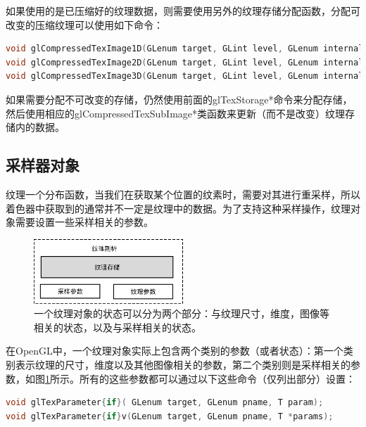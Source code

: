 如果使用的是已压缩好的纹理数据，则需要使用另外的纹理存储分配函数，分配可改变的压缩纹理可以使用如下命令：

\begin{lstlisting}[language=C++]
void glCompressedTexImage1D(GLenum target, GLint level, GLenum internalFormat, GLsizei width, GLint border, GLsizei imageSize, const void *data);
void glCompressedTexImage2D(GLenum target, GLint level, GLenum internalFormat, GLsizei width, GLsizei height, GLint border, GLsizei imageSize, const void *data);
void glCompressedTexImage3D(GLenum target, GLint level, GLenum internalFormat, GLsizei width, GLsizei height, GLsizei depth, GLint border, GLsizei imageSize, const void *data);
\end{lstlisting}

如果需要分配不可改变的存储，仍然使用前面的glTexStorage*命令来分配存储，然后使用相应的glCompressedTexSubImage*类函数来更新（而不是改变）纹理存储内的数据。






\subsection{采样器对象}
纹理一个分布函数，当我们在获取某个位置的纹素时，需要对其进行重采样，所以着色器中获取到的通常并不一定是纹理中的数据。为了支持这种采样操作，纹理对象需要设置一些采样相关的参数。

\begin{figure}
\sidecaption
	\includegraphics[width=0.5\textwidth]{figures/api/texture-anatomy}
	\caption{一个纹理对象的状态可以分为两个部分：与纹理尺寸，维度，图像等相关的状态，以及与采样相关的状态。}
	\label{f:api-sampler-parameter}
\end{figure}

在OpenGL中，一个纹理对象实际上包含两个类别的参数（或者状态）：第一个类别表示纹理的尺寸，维度以及其他图像相关的参数，第二个类别则是采样相关的参数，如图\ref{f:api-sampler-parameter}所示。所有的这些参数都可以通过以下这些命令（仅列出部分）设置：

\begin{lstlisting}[language=C++]
void glTexParameter{if}( GLenum target​, GLenum pname​, T param​);
void glTexParameter{if}v​(GLenum target​, GLenum pname​, T *params​);
\end{lstlisting}

